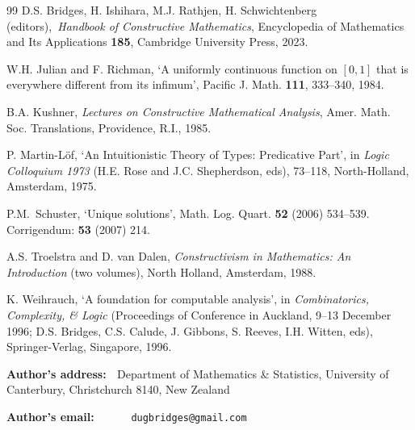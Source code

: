 \documentclass[11pt]{article}%
\begin{document}
\begin{thebibliography}{99}
D.S. Bridges, H. Ishihara, M.J. Rathjen, H. Schwichtenberg
(editors),\emph{\ Handbook of Constructive Mathematics}, Encyclopedia of
Mathematics and Its Applications \textbf{185}, Cambridge University Press, 2023.

W.H. Julian and F. Richman, `A uniformly continuous function
on $[0,1]$ that is everywhere different from its infimum', Pacific J. Math.
\textbf{111}, 333--340, 1984.

B.A. Kushner, \emph{Lectures on Constructive Mathematical
Analysis}, Amer. Math. Soc. Translations, Providence, R.I., 1985.

P. Martin-L\"{o}f, `An Intuitionistic Theory of Types:
Predicative Part', in \emph{Logic Colloquium 1973} (H.E. Rose and J.C.
Shepherdson, eds), 73--118, North-Holland, Amsterdam, 1975.

P.M.\ Schuster, `Unique solutions', Math. Log. Quart.
\textbf{52} (2006) 534--539. Corrigendum: \textbf{53} (2007) 214.

A.S. Troelstra and D. van Dalen, \emph{Constructivism in
Mathematics: An Introduction} (two volumes), North Holland, Amsterdam, 1988.

K. Weihrauch, `A foundation for computable analysis', in
\emph{Combinatorics, Complexity, \& Logic }(Proceedings of Conference in
Auckland, 9--13 December 1996; D.S. Bridges, C.S. Calude, J. Gibbons, S.
Reeves, I.H. Witten, eds), Springer-Verlag, Singapore, 1996.
\end{thebibliography}

%

\bigskip
%

\noindent
\textbf{Author's address: \ }Department of Mathematics \& Statistics,
University of Canterbury, Christchurch 8140, New Zealand%

\noindent
\textbf{Author's email: \ \ \ \ \ }\texttt{dugbridges@gmail.com}
\end{document}
